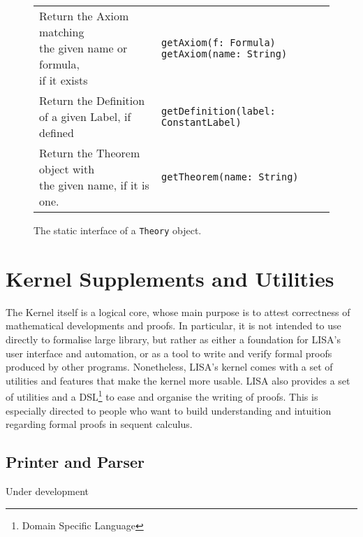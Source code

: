 {\begin{figure}
\begin{center}
\begin{tabular}{l|l}
\makecell[l]{Return the Axiom matching\\ the given name or formula,\\ if it exists} &
\begin{lstlisting}
getAxiom(f: Formula)
getAxiom(name: String)
\end{lstlisting}
\\ %
\makecell[l]{Return the Definition\\of a given Label, if defined} &
\begin{lstlisting}
getDefinition(label: ConstantLabel)
\end{lstlisting}
\\ %

\makecell[l]{Return the Theorem object with\\the given name, if it is one.} &
\begin{lstlisting}
getTheorem(name: String)
\end{lstlisting}
\\ %

\end{tabular}
\caption{The static interface of a \lstinline{Theory}{} object. \label{fig:theorygetters}}
\end{center}
\end{figure}
}
\newpage
\section{Kernel Supplements and Utilities}
\label{sect:kernelsuppl}
The Kernel itself is a logical core, whose main purpose is to attest correctness of mathematical developments and proofs. In particular, it is not intended to use directly to formalise large library, but rather as either a foundation for LISA's user interface and automation, or as a tool to write and verify formal proofs produced by other programs.
Nonetheless, LISA's kernel comes with a set of utilities and features that make the kernel more usable.
LISA also provides a set of utilities and a DSL\footnote{Domain Specific Language} to ease and organise the writing of proofs. This is especially directed to people who want to build understanding and intuition regarding formal proofs in sequent calculus.

\subsection{Printer and Parser}
Under development

